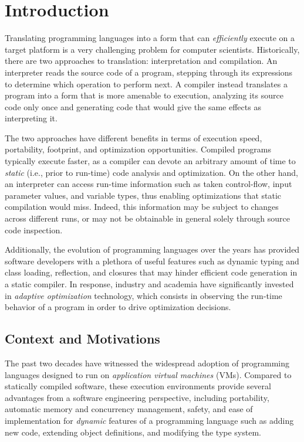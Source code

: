 
\chapter{Introduction}

Translating programming languages into a form that can {\em efficiently} execute on a target platform is a very challenging problem for computer scientists. Historically, there are two approaches to translation: interpretation and compilation. An interpreter reads the source code of a program, stepping through its expressions to determine which operation to perform next. A compiler instead translates a program into a form that is more amenable to execution, analyzing its source code only once and generating code that would give the same effects as interpreting it.

The two approaches have different benefits in terms of execution speed, portability, footprint, and optimization opportunities. Compiled programs typically execute faster, as a compiler can devote an arbitrary amount of time to {\em static} (i.e., prior to run-time) code analysis and optimization. On the other hand, an interpreter can access run-time information such as taken control-flow, input parameter values, and variable types, thus enabling optimizations that static compilation would miss. Indeed, this information may be subject to changes across different runs, or may not be obtainable in general solely through source code inspection.

Additionally, the evolution of programming languages over the years has provided software developers with a plethora of useful features such as dynamic typing and class loading, reflection, and closures that may hinder efficient code generation in a static compiler. In response, industry and academia have significantly invested in {\em adaptive optimization} technology, which consists in observing the run-time behavior of a program in order to drive optimization decisions.

\section{Context and Motivations}

The past two decades have witnessed the widespread adoption of programming languages designed to run on {\em application virtual machines} (VMs). Compared to statically compiled software, these execution environments provide several advantages from a software engineering perspective, including portability, automatic memory and concurrency management, safety, and ease of implementation for {\em dynamic} features of a programming language such as adding new code, extending object definitions, and modifying the type system.

